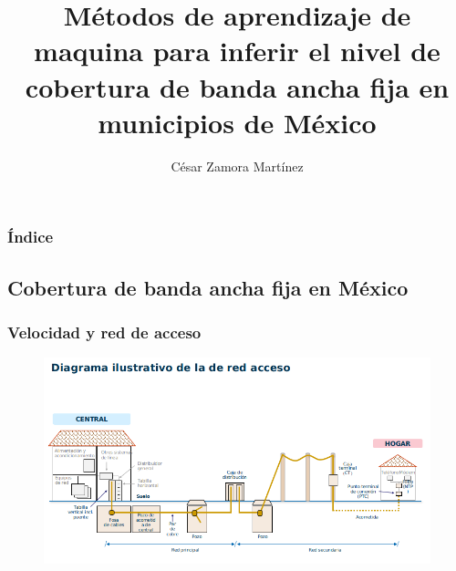 \documentclass[xcolor=dvipsnames, compress]{beamer}
\title[Aprendizaje de Máquina y Cobertura BAF]{M\'etodos de aprendizaje de maquina para inferir el nivel de cobertura de banda ancha fija en municipios de M\'exico}
\author{César Zamora Martínez}
\institute[ITAM]
\begin{document}
%
\begin{frame}
\titlepage
\end{frame}

\begin{frame}
\frametitle{Índice}
 \tableofcontents%
\end{frame}

%

\begin{frame}
\section{Cobertura de banda ancha fija en México}
\frametitle{Velocidad y red de acceso}
\begin{figure}
	\includegraphics[scale=0.43]{images/access_network.jpg}
\end{figure}
\end{frame}
\end{document}
